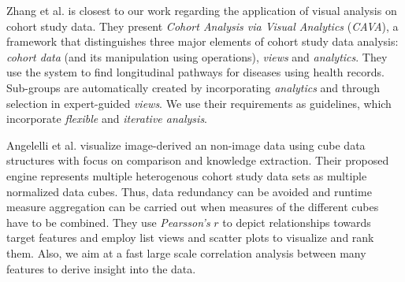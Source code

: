 \documentclass[journal]{style/vgtc} 			          %
\begin{document}
Zhang et al. \cite{Zhang2014, Gotz2014} is closest to our work regarding the application of visual analysis on cohort study data.
They present \emph{Cohort Analysis via Visual Analytics} (\emph{CAVA}), a framework that distinguishes three major elements of cohort study data analysis: \emph{cohort data} (and its manipulation using operations), \emph{views} and \emph{analytics}.
They use the system to find longitudinal pathways for diseases using health records.
Sub-groups are automatically created by incorporating \emph{analytics} and through selection in expert-guided \emph{views}.
We use their requirements as guidelines, which incorporate \emph{flexible} and \emph{iterative analysis}. %

Angelelli et al. \cite{Angelelli} visualize image-derived an non-image data using cube data structures with focus on comparison and knowledge extraction.
Their proposed engine represents multiple heterogenous cohort study data sets as multiple normalized data cubes.
Thus, data redundancy can be avoided and runtime measure aggregation can be carried out when measures of the different cubes have to be combined.
They use \emph{Pearsson's} $r$ to depict relationships towards target features and employ list views and scatter plots to visualize and rank them.
Also, we aim at a fast large scale correlation analysis between many features to derive insight into the data.
\end{document}
